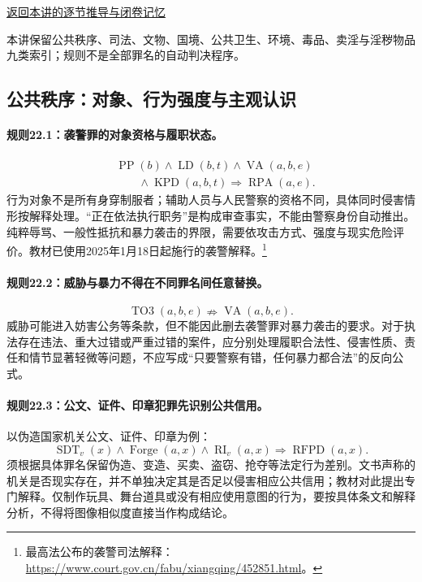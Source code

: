 \label{ref:lecture:22}

\noindent\hyperref[lecture:22]{返回本讲的逐节推导与闭卷记忆}

本讲保留公共秩序、司法、文物、国境、公共卫生、环境、毒品、卖淫与淫秽物品九类索引；规则不是全部罪名的自动判决程序。

\subsection{公共秩序：对象、行为强度与主观认识}
\paragraph{规则22.1：袭警罪的对象资格与履职状态。}
\[
\begin{aligned}
&\operatorname{PP}(b)\land\operatorname{LD}(b,t)
\land\operatorname{VA}(a,b,e)\\
&\qquad\land\operatorname{KPD}(a,b,t)
\Rightarrow\operatorname{RPA}(a,e).
\end{aligned}
\]
行为对象不是所有身穿制服者；辅助人员与人民警察的资格不同，具体同时侵害情形按解释处理。“正在依法执行职务”是构成审查事实，不能由警察身份自动推出。纯粹辱骂、一般性抵抗和暴力袭击的界限，需要依攻击方式、强度与现实危险评价。教材已使用2025年1月18日起施行的袭警解释。\footnote{最高法公布的袭警司法解释：\url{https://www.court.gov.cn/fabu/xiangqing/452851.html}。}

\paragraph{规则22.2：威胁与暴力不得在不同罪名间任意替换。}
\[
\operatorname{TO3}(a,b,e)\nRightarrow\operatorname{VA}(a,b,e).
\]
威胁可能进入妨害公务等条款，但不能因此删去袭警罪对暴力袭击的要求。对于执法存在违法、重大过错或严重过错的案件，应分别处理履职合法性、侵害性质、责任和情节显著轻微等问题，不应写成“只要警察有错，任何暴力都合法”的反向公式。

\paragraph{规则22.3：公文、证件、印章犯罪先识别公共信用。}
以伪造国家机关公文、证件、印章为例：
\[
\operatorname{SDT}_v(x)\land\operatorname{Forge}(a,x)
\land\operatorname{RI}_v(a,x)
\Rightarrow\operatorname{RFPD}(a,x).
\]
须根据具体罪名保留伪造、变造、买卖、盗窃、抢夺等法定行为差别。文书声称的机关是否现实存在，并不单独决定其是否足以侵害相应公共信用；教材对此提出专门解释。仅制作玩具、舞台道具或没有相应使用意图的行为，要按具体条文和解释分析，不得将图像相似度直接当作构成结论。


